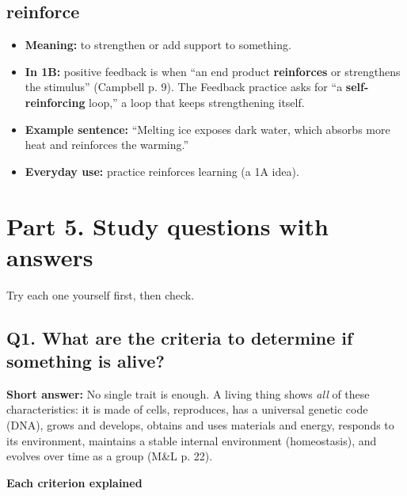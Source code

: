 \documentclass[11pt,letterpaper]{article}
\begin{document}
\subsection{reinforce}
\begin{itemize}
  \item \textbf{Meaning:} to strengthen or add support to something.
  \item \textbf{In 1B:} positive feedback is when ``an end product \textbf{reinforces} or strengthens the stimulus'' (Campbell p. 9). The Feedback practice asks for ``a \textbf{self-reinforcing} loop,'' a loop that keeps strengthening itself.
  \item \textbf{Example sentence:} ``Melting ice exposes dark water, which absorbs more heat and reinforces the warming.''
  \item \textbf{Everyday use:} practice reinforces learning (a 1A idea).
\end{itemize}


\section{Part 5. Study questions with answers}

Try each one yourself first, then check.

\subsection{Q1. What are the criteria to determine if something is alive?}

\textbf{Short answer:} No single trait is enough. A living thing shows \emph{all} of these characteristics: it is made of cells, reproduces, has a universal genetic code (DNA), grows and develops, obtains and uses materials and energy, responds to its environment, maintains a stable internal environment (homeostasis), and evolves over time as a group (M\&L p. 22).

\textbf{Each criterion explained}
\end{document}
